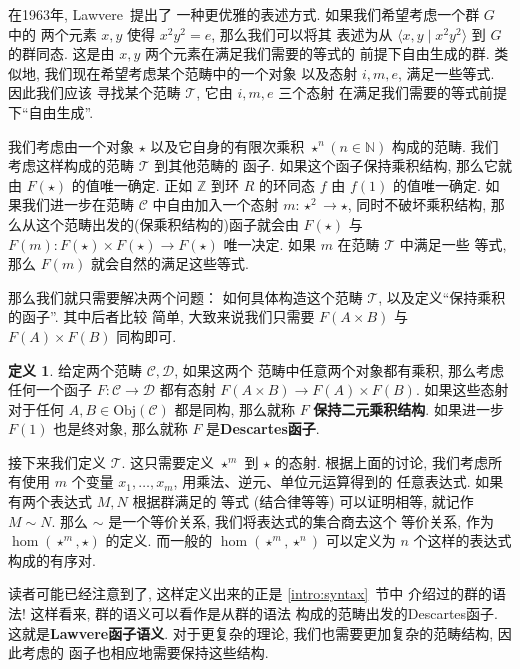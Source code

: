 \documentclass[UTF8]{ctexbook}
\theoremstyle{plain}
\theoremstyle{definition}
\newtheorem{definition}{定义}[chapter]
\theoremstyle{remark}
\begin{document}
在1963年, Lawvere~\cite{Lawvere:1963:functorial}提出了
一种更优雅的表述方式. 如果我们希望考虑一个群 \(G\) 中的
两个元素 \(x,y\) 使得 \(x^2y^2 = e\), 那么我们可以将其
表述为从 \(\langle x,y \mid x^2y^2 \rangle\) 到 \(G\)
的群同态. 这是由 \(x,y\) 两个元素在满足我们需要的等式的
前提下自由生成的群.
类似地, 我们现在希望考虑某个范畴中的一个对象
以及态射 \(i,m,e\), 满足一些等式. 因此我们应该
寻找某个范畴 \(\mathcal T\), 它由 \(i,m,e\) 三个态射
在满足我们需要的等式前提下“自由生成”.

我们考虑由一个对象 \(\star\)
以及它自身的有限次乘积 \(\star^n (n \in \mathbb N)\) 构成的范畴.
我们考虑这样构成的范畴 \(\mathcal T\) 到其他范畴的
函子. 如果这个函子保持乘积结构, 那么它就由 \(F(\star)\)
的值唯一确定. 正如 \(\mathbb Z\) 到环 \(R\) 的环同态 \(f\)
由 \(f(1)\) 的值唯一确定. 如果我们进一步在范畴 \(\mathcal C\)
中自由加入一个态射 \(m:\star^2 \to \star\), 同时不破坏乘积结构,
那么从这个范畴出发的(保乘积结构的)函子就会由 \(F(\star)\)
与 \(F(m) : F(\star) \times F(\star) \to F(\star)\)
唯一决定. 如果 \(m\) 在范畴 \(\mathcal T\) 中满足一些
等式, 那么 \(F(m)\) 就会自然的满足这些等式.

那么我们就只需要解决两个问题： 如何具体构造这个范畴
\(\mathcal T\), 以及定义“保持乘积的函子”. 其中后者比较
简单, 大致来说我们只需要 \(F(A \times B)\) 与 \(F(A) \times F(B)\) 同构即可.
\begin{definition}
给定两个范畴 \(\mathcal C,\mathcal D\), 如果这两个
范畴中任意两个对象都有乘积, 那么考虑任何一个函子 \(F : \mathcal C \to \mathcal D\)
都有态射 \(F(A \times B) \to F(A) \times F(B)\).
如果这些态射对于任何 \(A,B \in \mathrm{Obj}(\mathcal C)\)
都是同构, 那么就称 \(F\) \textbf{保持二元乘积结构}.
如果进一步 \(F(1)\) 也是终对象, 那么就称 \(F\) 是\textbf{Descartes函子}.
\end{definition}

接下来我们定义 \(\mathcal T\). 这只需要定义 \(\star^m\) 到
\(\star\) 的态射. 根据上面的讨论,
我们考虑所有使用 \(m\) 个变量
\(x_1,\dots,x_m\), 用乘法、逆元、单位元运算得到的
任意表达式. 如果有两个表达式 \(M,N\) 根据群满足的
等式 (结合律等等) 可以证明相等, 就记作 \(M \sim N\).
那么 \(\sim\) 是一个等价关系, 我们将表达式的集合商去这个
等价关系, 作为 \(\hom(\star^m, \star)\) 的定义.
而一般的 \(\hom(\star^m, \star^n)\) 可以定义为
\(n\) 个这样的表达式构成的有序对.

读者可能已经注意到了, 这样定义出来的正是 \ref{intro:syntax}~节中
介绍过的群的语法! 这样看来, 群的语义可以看作是从群的语法
构成的范畴出发的Descartes函子. 这就是\textbf{Lawvere函子语义}.
对于更复杂的理论, 我们也需要更加复杂的范畴结构, 因此考虑的
函子也相应地需要保持这些结构.
\end{document}
